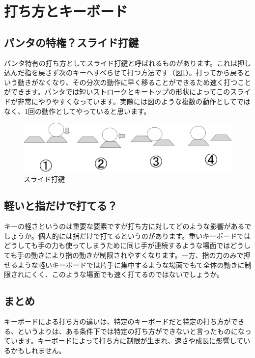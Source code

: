 \section{打ち方とキーボード}

\subsection{パンタの特権？スライド打鍵}
パンタ特有の打ち方としてスライド打鍵と呼ばれるものがあります。これは押し込んだ指を戻さず次のキーへすべらせて打つ方法です（図\ref{eigh:img8}）。打ってから戻るという動きがなくなり、その分次の動作に早く移ることができるため速く打つことができます。パンタでは短いストロークとキートップの形状によってこのスライドが非常にやりやすくなっています。実際には図のような複数の動作としてではなく、1回の動作としてやっていると思います。

\begin{figure}
 \begin{center}
   \includegraphics[width=14cm,clip]{res_eigh/img8.eps}
 \end{center}
 \caption{スライド打鍵}
 \label{eigh:img8}
\end{figure}

\subsection{軽いと指だけで打てる？}
キーの軽さというのは重要な要素ですが打ち方に対してどのような影響があるでしょうか。個人的には指だけで打てるというのがあります。重いキーボードではどうしても手の力も使ってしまうために同じ手が連続するような場面ではどうしても手の動きにより指の動きが制限されやすくなります。一方、指の力のみで押せるような軽いキーボードでは片手に集中するような場面でもて全体の動きに制限されにくく、このような場面でも速く打てるのではないでしょうか。

\subsection{まとめ}
キーボードによる打ち方の違いは、特定のキーボードだと特定の打ち方ができる、というよりは、ある条件下では特定の打ち方ができないと言ったものになっています。キーボードによって打ち方に制限が生まれ、速さや成長に影響しているかもしれません。

